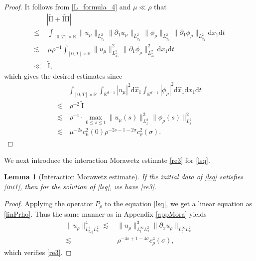 \documentclass[11pt,letterpaper,reqno]{amsart}
\numberwithin{equation}{section}
\newtheorem{lemma}[theorem]{Lemma}
\theoremstyle{definition}
\theoremstyle{remark}
\newcommand{\pa}{\partial}
\begin{document}
\begin{proof}
It follows from \eqref{L_formula_4}  and $\mu  \ll \rho$ that
	\begin{align*}
		&	\left|\widetilde{\mathrm{II}}+\widetilde{\mathrm{III}} \right| \\
		\leq	&\,\int_{[0,T]\times \mathbb{R}} \|  u_\mu  \|_{L^2_{\widehat{x}_1}} \|\pa_{1} u_\mu  \|_{L^2_{\widehat{x}_1}} \|\phi_\rho \|_{L^2_{\widehat{x}_1}} \|\pa_{1}\phi_{\rho } \|_{L^2_{\widehat{x}_1}} \mathrm{d} x_1\mathrm{d} t\nonumber\\
		  \lesssim &\, \mu  \rho^{-1}\int_{[0,T]\times \mathbb{R}} \|  u_\mu  \|^2_{L^2_{\widehat{x}_1}}  \|\pa_{1}\phi_\rho \|_{L^2_{\widehat{x}_1}}^2    \mathrm{d} x_1\mathrm{d} t\nonumber\\
		  \ll&\, \widetilde{\mathrm{I}},
	\end{align*}
	which gives the desired estimates since 
	\begin{align*}
		&\int_{[0,T]\times \mathbb{R}}	\int_{\mathbb{R}^{d-1}}|   u_\mu|^2\mathrm{d} \widehat{x}_1 \int_{\mathbb{R}^{d-1}} |\phi_\rho|^2 \mathrm{d} \widehat{x}_1 \mathrm{d} x_1\mathrm{d} t \\
		\lesssim &\,\rho^{-2} \ 	\widetilde{\mathrm{I}} \\
		\lesssim&\, \rho^{-1} \cdot   \max_{0\leq s \leq t} \|  u_\mu (s)\|_{L^2_x}^2  \| \phi_\rho(s)\|^2_{L^2_x}\\
		\lesssim &\,   \mu ^{-2s} c_\mu ^2(0) \rho^{-2s-1-2\sigma} c_\rho^2(\sigma).
	\end{align*}
\end{proof}

We next introduce  the interaction Morawetz estimate \eqref{re3} for \eqref{lsq}.
\begin{lemma}[Interaction Morawetz estimate]  \label{lem_lininta}
	If the initial data of \eqref{lsq} satisfies \eqref{ini1}, then for the solution of \eqref{lsq}, we have
	\eqref{re3}.
\end{lemma}
\begin{proof}Applying the operator 
	$P_\rho $ to the equation \eqref{lsq}, we get a linear equation as \eqref{linPrho}. Thus
	the same manner as in Appendix \ref{appMora} yields
\begin{align}
				 \|   u_\rho  \|^4_{L^4_{t,y}L^2_{z}} \lesssim &\,    \| u_\rho\|_{L^\infty_t L^2_x}^3  \|\pa_x  u_\rho\|_{L^\infty_t L^2_x}\nonumber\\
	\lesssim&\,  \rho^{-4s+1-4\sigma} c^4_\rho (\sigma), 
\end{align}
	which verifies \eqref{re3}.
\end{proof}	
\end{document}
